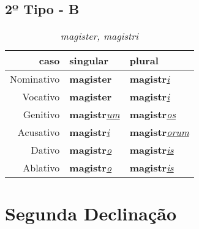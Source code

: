 \documentclass{article}
\newcommand{\radicaldesinencia}[2]{\textbf{#1}\textit{\underline{#2}}}
\begin{document}
\subsection*{2º Tipo - B}
\begin{table}[H]
\centering
\caption*{\textit{magister, magistri}}
\vspace{0.2cm}
\begin{tabular}{r|l|l}
\hline
caso			&	singular					& plural 								\\
\hline                                    		
\hline
Nominativo	&	\radicaldesinencia{magister}{}	& \radicaldesinencia{magistr}{i}		\\
Vocativo		&	\radicaldesinencia{magister}{}	& \radicaldesinencia{magistr}{i}		\\
Genitivo		&	\radicaldesinencia{magistr}{um}	& \radicaldesinencia{magistr}{os}		\\
Acusativo	&	\radicaldesinencia{magistr}{i}	& \radicaldesinencia{magistr}{orum}	\\
Dativo		&	\radicaldesinencia{magistr}{o}	& \radicaldesinencia{magistr}{is}		\\
Ablativo		&	\radicaldesinencia{magistr}{o}	& \radicaldesinencia{magistr}{is}		\\


 \hline
\end{tabular}
\end{table}
\clearpage





\section*{Segunda Declinação}
\end{document}
